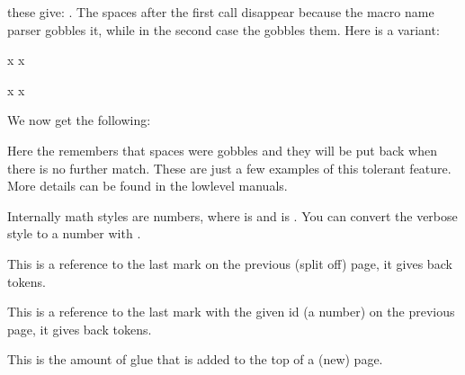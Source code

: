 \startbuffer
\foo \foo[1] \foo [1] \foo[1] [2] \foo [1] [2]
\stopbuffer

\typebuffer

these give: \inlinebuffer. The spaces after the first call disappear because the
macro name parser gobbles it, while in the second case the \type {#*} gobbles
them. Here is a variant:

\startbuffer
\tolerant{}

\foo[?] x
\foo[?] [?] x

\tolerant{}

\foo[?] x
\foo[?] [?] x
\stopbuffer

\typebuffer

We now get the following:

\getbuffer

Here the \type {#,} remembers that spaces were gobbles and they will be put back
when there is no further match. These are just a few examples of this tolerant
feature. More details can be found in the lowlevel manuals.

\stopnewprimitive


\startnewprimitive[title={\prm {tomathstyle}}]

Internally math styles are numbers, where  is \tomathstyle
\displaystyle \space and  is \tomathstyle
\crampedscriptscriptstyle. You can convert the verbose style to a number with
.

\stopnewprimitive

\startoldprimitive[title={\prm {topmark}}][obsolete=yes]

This is a reference to the last mark on the previous (split off) page, it gives
back tokens.

\stopoldprimitive

\startoldprimitive[title={\prm {topmarks}}]

This is a reference to the last mark with the given id (a number) on the previous
page, it gives back tokens.

\stopoldprimitive

\startoldprimitive[title={\prm {topskip}}]

This is the amount of glue that is added to the top of a (new) page.

\stopoldprimitive

\startnewprimitive[title={\prm {toscaled}}]

